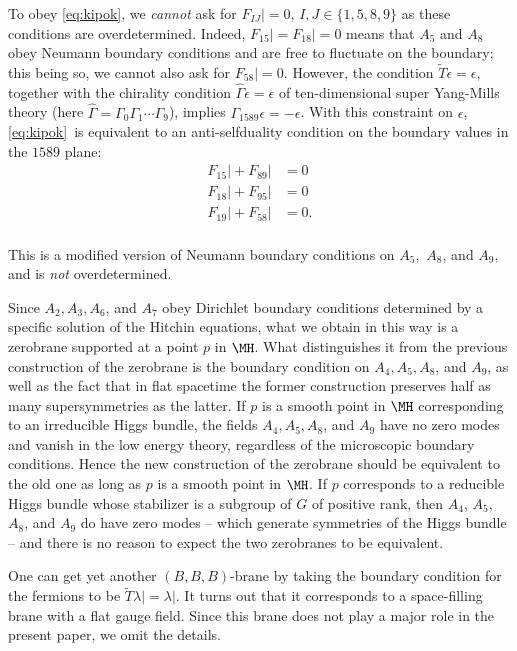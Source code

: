 To obey \eqref{eq:kipok},  we {\it cannot} ask for $F_{IJ}|=0$, $I,J\in
\{1,5,8,9\}$ as these conditions are overdetermined. Indeed,
$F_{15}|=F_{18}|=0$ means that $A_5$ and $A_8$ obey Neumann
boundary conditions and are free to fluctuate on the boundary;
this being so, we cannot also ask for $F_{58}\vert=0$. However,
the condition $\tilde T\epsilon=\epsilon$, together with the
chirality condition $\hat\Gamma\epsilon=\epsilon$ of
ten-dimensional super Yang-Mills theory (here
$\hat\Gamma=\Gamma_0\Gamma_1\cdots \Gamma_9$), implies
$\Gamma_{1589}\epsilon=-\epsilon$.  With this constraint on
$\epsilon$, \eqref{eq:kipok}\ is equivalent to an anti-selfduality condition
on the boundary values in the $1589$ plane:
\setcounter{equation}{18}
\begin{equation}\label{eq:ubb}
\begin{aligned}F_{15}\vert+F_{89}\vert & = 0 \\
                  F_{18}\vert+F_{95}\vert & = 0 \\
                  F_{19}\vert+F_{58}\vert & = 0. \\\end{aligned}
\end{equation}

This is a modified version of Neumann boundary conditions on
$A_5,$ $A_8$, and $A_9$, and is {\it not} overdetermined.

Since $A_2,A_3, A_6$, and $A_7$ obey Dirichlet boundary conditions
determined by a specific solution of the Hitchin equations, what
we obtain in this way is a zerobrane supported at a point $p$ in
$\MH$.  What distinguishes it from the previous construction of
the zerobrane is the boundary condition on $A_4,A_5,A_8$, and
$A_9$, as well as the fact that in flat spacetime the former
construction preserves half as many supersymmetries as the latter.
If $p$ is a smooth point in $\MH$ corresponding to an irreducible
Higgs bundle, the fields $A_4,A_5,A_8$, and $A_9$ have no zero
modes and vanish in the low energy theory, regardless of the
microscopic boundary conditions. Hence the new construction of the
zerobrane should be equivalent to the old one as long as $p$ is a
smooth point in $\MH$.  If $p$ corresponds to a reducible Higgs
bundle whose stabilizer is a subgroup of $G$ of positive rank,
then $A_4$, $A_5$, $A_8$, and $A_9$ do have zero modes -- which
generate symmetries of the Higgs bundle -- and there is no reason
to expect the two zerobranes to be equivalent.

One can get yet another $(B,B,B)$-brane by taking the boundary
condition for the fermions to be $\tilde T\lambda\vert =
\lambda\vert$. It turns out that it corresponds to a space-filling
brane with a flat gauge field. Since this brane does not play a
major role in the present paper, we omit the details.
